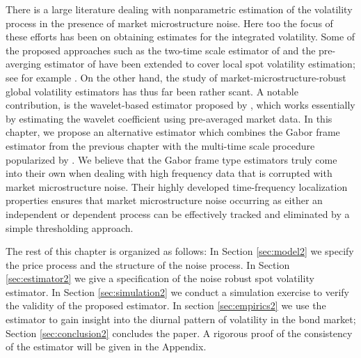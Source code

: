 There is a large literature dealing with nonparametric estimation of the volatility process in the presence of market microstructure noise. Here too the focus of these efforts has been on obtaining estimates for the integrated volatility. Some of the proposed approaches such as the two-time scale estimator of \cite{Zhang2005} and the pre-averging estimator of \cite{Podolskij2007} have been extended to cover local spot volatility estimation; see for example \cite{Zu2014}. On the other hand,  the study of market-microstructure-robust global volatility estimators has thus far been rather scant. A notable contribution, is the wavelet-based estimator proposed by \cite{Hoffmann2012}, which works essentially by estimating the wavelet coefficient using pre-averaged market data. In this chapter, we propose an alternative estimator which combines the Gabor frame estimator from the previous chapter with the multi-time scale procedure popularized by \cite{Zhang2005}. We believe that the Gabor frame type estimators truly come into their own when dealing with high frequency data that is corrupted with market microstructure noise. Their highly developed time-frequency localization properties ensures that market microstructure noise occurring as either an independent or dependent process can be effectively tracked and eliminated by a simple thresholding approach. 

The rest of this chapter is organized as follows: In Section \ref{sec:model2} we specify the price process and the structure of the noise process. In Section \ref{sec:estimator2} we give a specification of the noise robust spot volatility estimator. In Section \ref{sec:simulation2} we conduct a simulation exercise to verify the validity of the proposed estimator. In section \ref{sec:empirics2} we use the estimator to gain insight into the diurnal pattern of volatility in the bond market; Section \ref{sec:conclusion2} concludes the paper. A rigorous proof of the consistency of the estimator will be given in the Appendix. 
